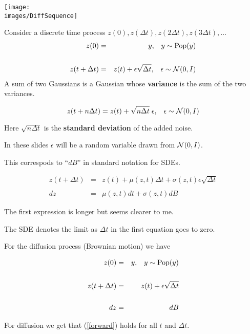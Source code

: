 {
\centerline{\texttt{[image: \\images/DiffSequence]}}

Consider a discrete time process $z(0),z(\Delta t),z(2\Delta t),z(3\Delta t),\ldots$
{\huge
\begin{eqnarray*}
  z(0) & = & y,\;\;\;y \sim \mathrm{Pop}(y) \\
  \\
  z(t+\Delta t) & = & z(t) + \epsilon\sqrt{\Delta t},\;\;\;\epsilon \sim {\cal N}(0,I)
\end{eqnarray*}
}
A sum of two Gaussians is a Gaussian whose {\bf variance} is the sum of the two variances.

\vfill
$$z(t+n\Delta t) = z(t) + \sqrt{n\Delta t}\; \epsilon,\;\;\;\epsilon \sim {\cal N}(0,I)$$

\vfill
Here $\sqrt{n \Delta t}$ is the {\bf standard deviation} of the added noise.

In these slides $\epsilon$ will be a random variable drawn from ${\cal N}(0,I)$.

\vfill
This correspods to ``$dB$'' in standard notation for SDEs.

\vfill
{\huge
\begin{eqnarray*}
  z(t+\Delta t) & = & z(t) + \mu(z,t)\Delta t + \sigma(z,t)\epsilon\sqrt{\Delta t} \\
  \\
  dz & = & \mu(z,t)dt + \sigma(z,t)dB
\end{eqnarray*}
}

\vfill
The first expression is longer but seems clearer to me.

\vfill
The SDE denotes the limit as $\Delta t$ in the first equation goes to zero.


\vfill
For the diffusion process (Brownian motion) we have

\vfill
{\huge
\begin{eqnarray}
  z(0) & = & y,\;\;\;y \sim \mathrm{Pop}(y) \nonumber \\
  \nonumber \\
  z(t+\Delta t) & = & z(t) + \epsilon\sqrt{\Delta t} \label{forward} \\
  \nonumber \\
  dz & = & dB \nonumber
\end{eqnarray}
}

\vfill
For diffusion we get that (\ref{forward}) holds for all $t$ and $\Delta t$.


}
